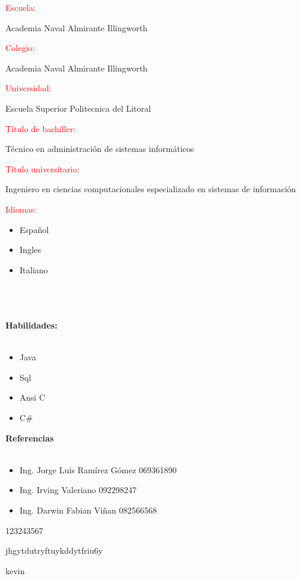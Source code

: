 \documentclass[20pt]{article}
\begin{document}
\begin{large}
\textcolor{red}{Escuela:}
\end{large}
Academia Naval Almirante Illingworth\\

\begin{large}
\textcolor{red}{Colegio:}
\end{large}
Academia Naval Almirante Illingworth\\

\begin{large}
\textcolor{red}{Universidad:}
\end{large}
Escuela Superior Politecnica del Litoral\\

\begin{large}
\textcolor{red}{Título de bachiller:}
\end{large}
Técnico en administración de sistemas informáticos\\

\begin{large}
\textcolor{red}{Título universitario:}
\end{large}
Ingeniero en ciencias computacionales especializado en sistemas de información\\

\begin{large}
\textcolor{red}{Idiomas:}
\end{large}
\begin{itemize}
\item Español
\item Ingles
\item Italiano\\\\\\\\
\end{itemize}

\begin{center}
\begin{huge}
\textbf{Habilidades:}\\\
\end{huge}
\end{center}
\begin{itemize}
\item Java
\item Sql
\item Ansi C
\item C\#\\
\end{itemize}


\begin{center}
\begin{huge}
\textbf{Referencias}\\\
\end{huge}
\end{center}

\begin{itemize}
\item Ing. Jorge Luis Ramírez Gómez 		069361890
\item Ing. Irving Valeriano			092298247
\item Ing. Darwin Fabian Viñan 		082566568
\end{itemize}

123243567


jhgytdutryftuykddytfriu6y

kevin
\end{document}
